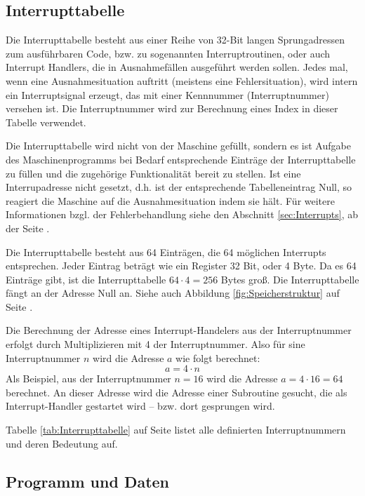 \subsection{Interrupttabelle}
\label{subsubsec:Interrupttabelle}

Die Interrupttabelle besteht aus einer Reihe von 32-Bit langen Sprungadressen
zum ausführbaren Code, bzw. zu sogenannten Interruptroutinen, oder auch \glqq
Interrupt Handlers\grqq, die in Ausnahmefällen ausgeführt werden sollen. Jedes
mal, wenn eine Ausnahmesituation auftritt (meistens eine Fehlersituation), wird
intern ein Interruptsignal erzeugt, das mit einer Kennnummer (Interruptnummer)
versehen ist. Die Interruptnummer wird zur Berechnung eines Index in dieser
Tabelle verwendet.


Die Interrupttabelle wird nicht von der Maschine gefüllt, sondern es ist
Aufgabe des Maschinenprogramms bei Bedarf entsprechende Einträge der
Interrupttabelle zu füllen und die zugehörige Funktionalität bereit zu stellen.
Ist eine Interrupadresse nicht gesetzt, d.h. ist der entsprechende
Tabelleneintrag Null, so reagiert die Maschine auf die Ausnahmesituation
indem sie hält. Für weitere Informationen bzgl. der Fehlerbehandlung siehe den
Abschnitt \ref{sec:Interrupts}, ab der Seite \pageref{sec:Interrupts}.

Die Interrupttabelle besteht aus 64 Einträgen, die 64 möglichen Interrupts
entsprechen. Jeder Eintrag beträgt wie ein Register 32 Bit, oder 4 Byte. Da es
64 Einträge gibt, ist die Interrupttabelle $64 \cdot 4 = 256$ Bytes groß. Die
Interrupttabelle fängt an der Adresse Null an. Siehe auch Abbildung
\ref{fig:Speicherstruktur} auf Seite \pageref{fig:Speicherstruktur}.

Die Berechnung der Adresse eines Interrupt-Handelers aus der Interruptnummer
erfolgt durch Multiplizieren mit 4 der Interruptnummer. Also für sine
Interruptnummer $n$ wird die Adresse $a$ wie folgt berechnet:
\[
    a = 4 \cdot n
\]
Als Beispiel, aus der Interruptnummer $n = 16$ wird die Adresse 
$a = 4 \cdot 16 = 64$ berechnet. An dieser Adresse wird die Adresse einer
Subroutine gesucht, die als Interrupt-Handler gestartet wird -- bzw. dort
gesprungen wird.

Tabelle \ref{tab:Interrupttabelle} auf Seite \pageref{tab:Interrupttabelle}
listet alle definierten Interruptnummern und deren
Bedeutung auf.


\subsection{Programm und Daten}
\label{subsec:Prog-Daten}

